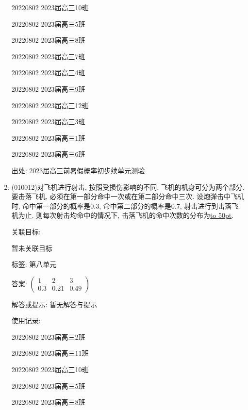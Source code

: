 \documentclass[10pt,a4paper]{article}
\newcommand{\blank}[1]{\underline{\hbox to #1pt{}}}
\begin{document}
\begin{enumerate}[1.]
20220802	2023届高三10班	

20220802	2023届高三5班	

20220802	2023届高三8班	

20220802	2023届高三7班	

20220802	2023届高三4班	

20220802	2023届高三9班	

20220802	2023届高三12班	

20220802	2023届高三3班	

20220802	2023届高三1班	

20220802	2023届高三6班	


出处: 2023届高三前暑假概率初步续单元测验
\item { (010012)}对飞机进行射击, 按照受损伤影响的不同, 飞机的机身可分为两个部分. 要击落飞机, 必须在第一部分命中一次或在第二部分命中三次. 设炮弹击中飞机时, 命中第一部分的概率是$0.3$, 命中第二部分的概率是$0.7$, 射击进行到击落飞机为止. 则每次射击均命中的情况下, 击落飞机的命中次数的分布为\blank{50}.


关联目标:

暂未关联目标



标签: 第八单元

答案: $\begin{pmatrix} 1 & 2 & 3 \\ 0.3 & 0.21 & 0.49\end{pmatrix}$

解答或提示: 暂无解答与提示

使用记录:

20220802	2023届高三2班	

20220802	2023届高三11班	

20220802	2023届高三10班	

20220802	2023届高三5班	

20220802	2023届高三8班	


\end{enumerate}
\end{document}
